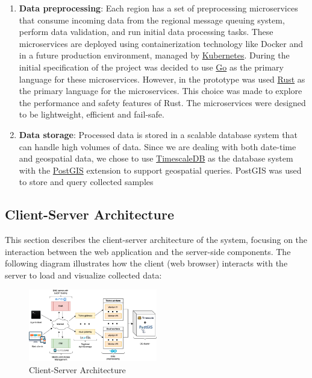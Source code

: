\begin{enumerate}
	\item \textbf{Data preprocessing}: Each region has a set of preprocessing microservices that consume incoming data from the regional message queuing system, perform data validation, and run initial data processing tasks. These microservices are deployed using containerization technology like Docker and in a future production environment, managed by \href{https://kubernetes.io/}{Kubernetes}.
	      During the initial specification of the project was decided to use \href{https://golang.org/}{Go} as the primary language for these microservices. However, in the prototype was used \href{https://rust-lang.org/}{Rust} as the primary language for the microservices. This choice was made to explore the performance and safety features of Rust. The microservices were designed to be lightweight, efficient and fail-safe.

	\item \textbf{Data storage}: Processed data is stored in a scalable database system that can handle high volumes of data. Since we are dealing with both date-time and geospatial data, we chose to use \href{https://www.timescale.com/}{TimescaleDB} as the database system with the \href{https://postgis.net/}{PostGIS} extension to support geospatial queries.
	      PostGIS was used to store and query collected samples
\end{enumerate}

\subsection{Client-Server Architecture}

This section describes the client-server architecture of the system, focusing on the interaction between the web application and the server-side components. The following diagram illustrates how the client (web browser) interacts with the server to load and visualize collected data:

\begin{figure}[h!]
	\centering
	\includegraphics[width=0.5\textwidth]{../../assets/diagrams/web_app_architecture/web_app_architecture.png}
	\caption{Client-Server Architecture}
\end{figure}

